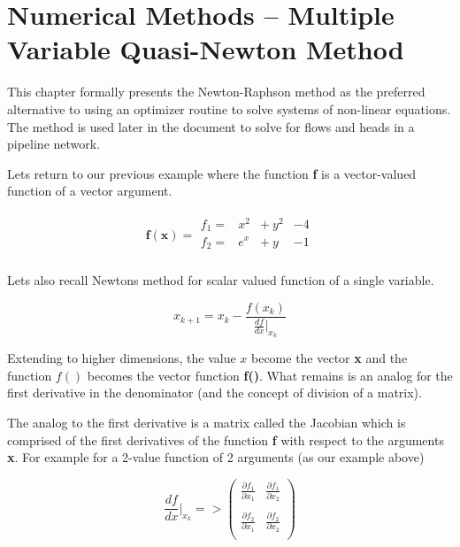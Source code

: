 \section{Numerical Methods -- Multiple Variable Quasi-Newton Method}
This chapter formally presents the Newton-Raphson method as the preferred alternative to using an optimizer routine to solve systems of non-linear equations.
The method is used later in the document to solve for flows and heads in a pipeline network.

Lets return to our previous example where the function \textbf{f} is a vector-valued function of a vector argument.

\begin{gather}
\mathbf{f(x)} = 
\begin{matrix}
f_1 = & x^2 & +~y^2 & - 4\\
f_2 = & e^x & +~y  & - 1\\
\end{matrix}
\end{gather}

Lets also recall Newtons method for scalar valued function of a single variable.

\begin{equation}
x_{k+1}=x_{k} - \frac{  f(x_{k})  }{   \frac{df}{dx}\rvert_{x_k} } 
\label{eqn:NewtonFormula}
\end{equation}

Extending to higher dimensions, the value $x$ become the vector \textbf{x} and the function $f()$ becomes the vector function \textbf{f()}.
What remains is an analog for the first derivative in the denominator (and the concept of division of a matrix).

The analog to the first derivative is a matrix called the Jacobian which is comprised of the first derivatives of the function \textbf{f} with respect to the arguments \textbf{x}.   
For example for a 2-value function of 2 arguments (as our example above)

\begin{equation}
\frac{df}{dx}\rvert_{x_k} =>
\begin{pmatrix}
\frac{\partial f_1}{\partial x_1} & \frac{\partial f_1}{\partial x_2} \\
~ & ~ \\
\frac{\partial f_2}{\partial x_1} & \frac{\partial f_2}{\partial x_2} \\
\end{pmatrix}
\label{eqn:Jacobian}
\end{equation}

